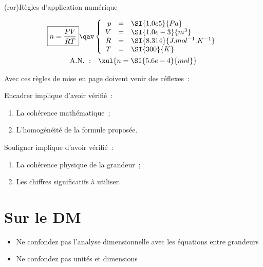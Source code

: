 \documentclass[a4paper, 12pt, final, garamond]{book}
\begin{document}
\begin{tcb}(ror){Règles d'application numérique}
	\vspace*{-10pt}
	\begin{minipage}{0.45\linewidth}
		\begin{gather*}
			\boxed{n = \frac{PV}{RT}}
			\qav
			\left\{
			\begin{array}{rcl}
				p & = & \SI{1.0e5}{Pa}                \\
				V & = & \SI{1.0e-3}{m^3}              \\
				R & = & \SI{8.314}{J.mol^{-1}.K^{-1}} \\
				T & = & \SI{300}{K}
			\end{array}
			\right.\\
			\mathrm{A.N.~:}\quad
			\xul{n = \SI{5.6e-4}{mol}}
		\end{gather*}
	\end{minipage}
	\hfill
	\smallbreak
	Avec ces règles de mise en page doivent venir des réflexes~:
	\smallbreak
	\begin{isd}
		Encadrer implique d'avoir vérifié~:
		\begin{enumerate}
			\item La cohérence mathématique~;
			\item L'homogénéité de la formule proposée.
		\end{enumerate}
		\tcblower
		Souligner implique d'avoir vérifié~:
		\begin{enumerate}
			\item La cohérence physique de la grandeur~;
			\item Les chiffres significatifs à utiliser.
		\end{enumerate}
	\end{isd}
\end{tcb}

\section{Sur le DM}

\begin{itemize}[label=$\diamond$, leftmargin=10pt]
	\item Ne confondez pas l'analyse dimensionnelle avec les équations entre
	      grandeurs
	\item Ne confondez pas unités et dimensions
\end{itemize}
\end{document}
